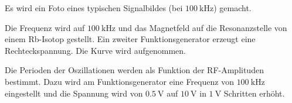 Es wird ein Foto eines typischen Signalbildes (bei $\SI{100}{\kilo\hertz}$) gemacht. %



Die Frequenz wird auf $\SI{100}{\kilo\hertz}$ und das Magnetfeld auf die Resonanzstelle von einem Rb-Isotop gestellt. Ein zweiter Funktionsgenerator erzeugt eine Rechteckspannung. %
Die Kurve wird aufgenommen. %

Die Perioden der Oszillationen werden als Funktion der RF-Amplituden bestimmt. Dazu wird am Funktionsgenerator eine Frequenz von $\SI{100}{\kilo\hertz}$ eingestellt und die Spannung wird von $\SI{0.5}{\volt}$ auf $\SI{10}{\volt}$ in $\SI{1}{\volt}$ Schritten erhöht.
